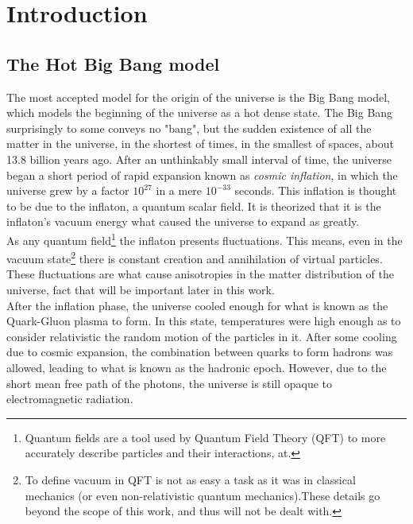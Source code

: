 \chapter{Introduction}

\section{The Hot Big Bang model}

The most accepted model for the origin of the universe is the Big Bang model, which models the beginning of the universe as a hot dense state. The Big Bang surprisingly to some conveys no "bang", but the sudden existence of all the matter in the universe, in the shortest of times, in the smallest of spaces, about 13.8 billion years ago. After an unthinkably small interval of time, the universe began a short period of rapid expansion known as \textit{cosmic inflation}, in which the universe grew by a factor $10^{27}$ in a mere $10^{-33}$ seconds. This inflation is thought to be due to the inflaton, a quantum scalar field. It is theorized that it is the inflaton's vacuum energy what caused the universe to expand as greatly. \\

As any quantum field\footnote{Quantum fields are a tool used by Quantum Field Theory (QFT) to more accurately describe particles and their interactions, at.} the inflaton presents fluctuations. This means, even in the vacuum state\footnote{To define vacuum in QFT is not as easy a task as it was in classical mechanics (or even non-relativistic quantum mechanics).These details go beyond the scope of this work, and thus will not be dealt with.} there is constant creation and annihilation of virtual particles. These fluctuations are what cause anisotropies in the matter distribution of the universe, fact that will be important later in this work. \\

After the inflation phase, the universe cooled enough for what is known as the Quark-Gluon plasma to form. In this state, temperatures were high enough as to consider relativistic the random motion of the particles in it. After some cooling due to cosmic expansion, the combination between quarks to form hadrons was allowed, leading to what is known as the hadronic epoch. However, due to the short mean free path of the photons, the universe is still opaque to electromagnetic radiation. \\

